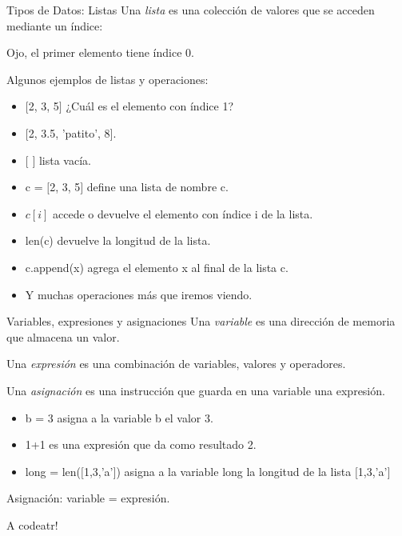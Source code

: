 \documentclass{beamer}
\begin{document}
\begin{frame}{Tipos de Datos:  Listas}
Una \emph{lista} es una colección de valores que se acceden mediante un índice:



\alert{Ojo, el primer elemento tiene índice 0.}\pause

Algunos ejemplos de listas y operaciones:
\begin{itemize}
	\item $[$2, 3, 5$]$ \pause ¿Cuál es el elemento con índice 1?\pause
	\item $[$2, 3.5, 'patito', 8$]$.\pause
	\item $[$ $]$ lista vacía.\pause
	\item c = $[$2, 3, 5$]$ define una lista de nombre c.
	\item $c[i]$ accede o devuelve el elemento con índice i de la lista.\pause
	\item len(c) devuelve la longitud de la lista.\pause
	\item c.append(x) agrega el elemento x al final de la lista c.
	\item Y muchas operaciones más que iremos viendo.
\end{itemize}
\end{frame}


\begin{frame}{Variables, expresiones y asignaciones}
Una \emph{variable} es una dirección de memoria que almacena un valor.\pause

Una \emph{expresión} es una combinación de variables, valores y operadores.\pause

Una \emph{asignación} es una instrucción que guarda en una variable una expresión.\pause

\begin{itemize}
	\item b = 3 asigna a la variable b el valor 3.\pause
	\item 1+1 es una expresión que da como resultado 2.\pause
	\item long = len($[$1,3,'a'$]$) asigna a la variable long la longitud de la lista $[$1,3,'a'$]$
\end{itemize}

\alert{Asignación: variable = expresión}.
\end{frame}




\begin{frame}{A codeatr!}
\begin{block}
	
\end{block}
\end{frame}
\end{document}
